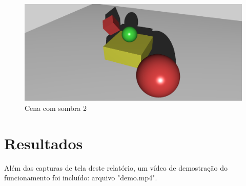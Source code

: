 \documentclass[11pt, a4paper]{article}
\begin{document}
\begin{figure}[H]
  \begin{center}
  \includegraphics[width=0.8\linewidth]{shadow-2.png}
  \caption{Cena com sombra 2}
  \label{fig:vaz}
  \end{center}
\end{figure}

\section {Resultados}

Além das capturas de tela deste relatório, um vídeo de demostração do funcionamento 
foi incluído: arquivo "demo.mp4".
\end{document}
